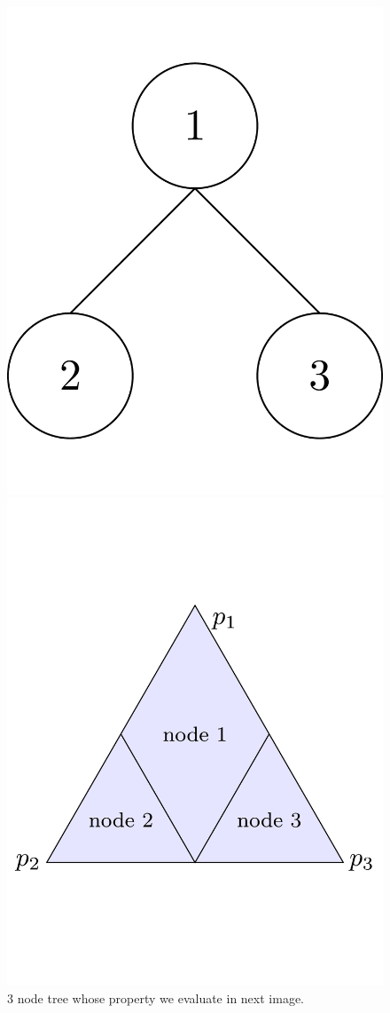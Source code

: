 \documentclass[12pt]{article}
\begin{document}
\begin{figure}
\begin{minipage}{0.45\linewidth}
	\centering
	\includegraphics[width=0.9\linewidth]{tikz/3-node-tree.pdf}
	\caption{3 node tree whose property we evaluate in next image.}
\end{minipage}
\hfill
\begin{minipage}{0.45\linewidth}
	\centering
	\includegraphics[width=0.9\linewidth]{tikz/3-node-tree-prop.pdf}

\end{minipage}
\end{figure}
\end{document}
